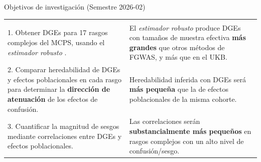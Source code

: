 \begin{frame}[c]{Objetivos de investigación (Semestre 2026-02)}
  \sffamily\small
  \renewcommand{\arraystretch}{2.0}   %
  \begin{tabular}{p{} p{}}
    \multicolumn{1}{c}{\cellcolor{ccgblue}{\textcolor{white}{\large\bfseries Objetivos}}} & 
    \multicolumn{1}{c}{\cellcolor{ccgblue}{\textcolor{white}{\large\bfseries Resultados esperados}}} \\

    1. Obtener DGEs para 17 rasgos complejos del MCPS, usando el \textit{estimador robusto} \parencite{guan2025-fgwas}. &
    El \textit{estimador robusto} \parencite{guan2025-fgwas} produce DGEs con tamaños de muestra efectiva \textbf{más grandes} que otros métodos de FGWAS, y más que en el UKB. \\

    2. Comparar heredabilidad de DGEs y efectos poblacionales en cada rasgo para determinar la \textbf{dirección de atenuación} de los efectos de confusión. &
    Heredabilidad inferida con DGEs será \textbf{más pequeña} que la de efectos poblacionales de la misma cohorte. \\

    3. Cuantificar la magnitud de sesgos mediante correlaciones entre DGEs y efectos poblacionales. &
    Las correlaciones serán \textbf{substancialmente más pequeños} en rasgos complejos con un alto nivel de confusión/sesgo.
  \end{tabular}
\end{frame}